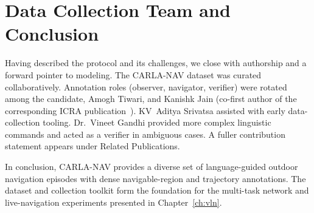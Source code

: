 \section{Data Collection Team and Conclusion}

Having described the protocol and its challenges, we close with authorship and a forward pointer to modeling. The CARLA-NAV dataset was curated collaboratively. Annotation roles (observer, navigator, verifier) were rotated among the candidate, Amogh Tiwari, and Kanishk Jain (co-first author of the corresponding ICRA publication~\cite{jain2023ground}). KV~Aditya Srivatsa assisted with early data-collection tooling. Dr.~Vineet Gandhi provided more complex linguistic commands and acted as a verifier in ambiguous cases. A fuller contribution statement appears under Related Publications.

In conclusion, CARLA-NAV provides a diverse set of language-guided outdoor navigation episodes with dense navigable-region and trajectory annotations. The dataset and collection toolkit form the foundation for the multi-task network and live-navigation experiments presented in Chapter~\ref{ch:vln}.
